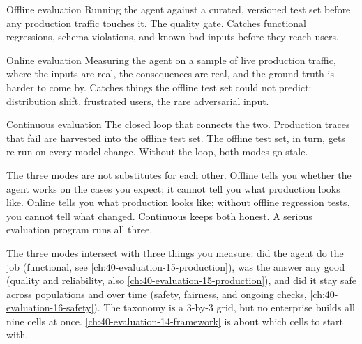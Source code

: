 \begin{TNdefinition}{Offline evaluation}
Running the agent against a curated, versioned test set before any production traffic touches it. The quality gate. Catches functional regressions, schema violations, and known-bad inputs before they reach users.
\end{TNdefinition}

\begin{TNdefinition}{Online evaluation}
Measuring the agent on a sample of live production traffic, where the inputs are real, the consequences are real, and the ground truth is harder to come by. Catches things the offline test set could not predict: distribution shift, frustrated users, the rare adversarial input.
\end{TNdefinition}

\begin{TNdefinition}{Continuous evaluation}
The closed loop that connects the two. Production traces that fail are harvested into the offline test set. The offline test set, in turn, gets re-run on every model change. Without the loop, both modes go stale.
\end{TNdefinition}

The three modes are not substitutes for each other. Offline tells you whether the agent works on the cases you expect; it cannot tell you what production looks like. Online tells you what production looks like; without offline regression tests, you cannot tell what changed. Continuous keeps both honest. A serious evaluation program runs all three.

The three modes intersect with three things you measure: did the agent do the job (functional, see \autoref{ch:40-evaluation-15-production}), was the answer any good (quality and reliability, also \autoref{ch:40-evaluation-15-production}), and did it stay safe across populations and over time (safety, fairness, and ongoing checks, \autoref{ch:40-evaluation-16-safety}). The taxonomy is a 3-by-3 grid, but no enterprise builds all nine cells at once. \autoref{ch:40-evaluation-14-framework} is about which cells to start with.

